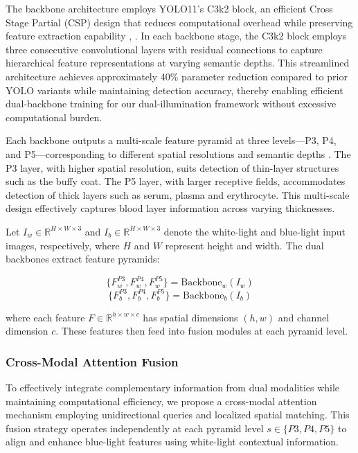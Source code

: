 The backbone architecture employs YOLO11's C3k2 block, an efficient Cross Stage Partial (CSP) design that reduces computational overhead while preserving feature extraction capability \cite{yolo11}, \cite{yolo8-11}. In each backbone stage, the C3k2 block employs three consecutive convolutional layers with residual connections to capture hierarchical feature representations at varying semantic depths. This streamlined architecture achieves approximately 40\% parameter reduction compared to prior YOLO variants while maintaining detection accuracy, thereby enabling efficient dual-backbone training for our dual-illumination framework without excessive computational burden.

Each backbone outputs a multi-scale feature pyramid at three levels—P3, P4, and P5—corresponding to different spatial resolutions and semantic depths \cite{pyramid}. The P3 layer, with higher spatial resolution, suits detection of thin-layer structures such as the buffy coat. The P5 layer, with larger receptive fields, accommodates detection of thick layers such as serum, plasma and erythrocyte. This multi-scale design effectively captures blood layer information across varying thicknesses.

Let $I_w \in \mathbb{R}^{H \times W \times 3}$ and $I_b \in \mathbb{R}^{H \times W \times 3}$ denote the white-light and blue-light input images, respectively, where $H$ and $W$ represent height and width. The dual backbones extract feature pyramids:

\begin{equation}
\{F_w^{P3}, F_w^{P4}, F_w^{P5}\} = \text{Backbone}_w(I_w)
\end{equation}
\begin{equation}
\{F_b^{P3}, F_b^{P4}, F_b^{P5}\} = \text{Backbone}_b(I_b)
\end{equation}

where each feature $F \in \mathbb{R}^{h \times w \times c}$ has spatial dimensions $(h, w)$ and channel dimension $c$. These features then feed into fusion modules at each pyramid level.

\subsubsection{Cross-Modal Attention Fusion}

To effectively integrate complementary information from dual modalities while maintaining computational efficiency, we propose a cross-modal attention mechanism employing unidirectional queries and localized spatial matching. This fusion strategy operates independently at each pyramid level $s \in \{P3, P4, P5\}$ to align and enhance blue-light features using white-light contextual information.

